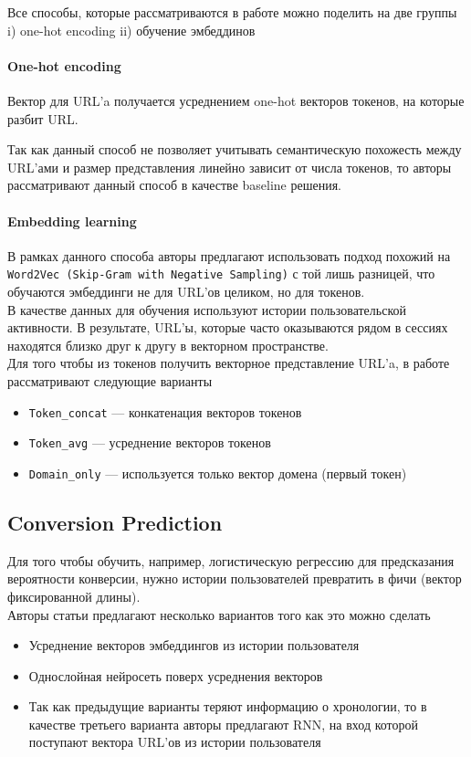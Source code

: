 Все способы, которые рассматриваются в работе можно поделить на две группы i) one-hot encoding ii) обучение эмбеддинов

\paragraph{One-hot encoding} Вектор для URL'a получается усреднением one-hot векторов токенов, на которые разбит URL.

Так как данный способ не позволяет учитывать семантическую похожесть между URL'ами и размер представления линейно зависит от числа токенов, то авторы рассматривают данный способ в качестве baseline решения.

\paragraph{Embedding learning} В рамках данного способа авторы предлагают использовать подход похожий на \texttt{Word2Vec (Skip-Gram with Negative Sampling)} с той лишь разницей, что обучаются эмбеддинги не для URL'ов целиком, но для токенов. \\

В качестве данных для обучения используют истории пользовательской активности. В результате, URL'ы, которые часто оказываются рядом в сессиях находятся близко друг к другу в векторном пространстве. \\

Для того чтобы из токенов получить векторное представление URL'a, в работе рассматривают следующие варианты
\begin{itemize}
    \item \texttt{Token\_concat} --- конкатенация векторов токенов
    \item \texttt{Token\_avg} --- усреднение векторов токенов
    \item \texttt{Domain\_only} --- используется только вектор домена (первый токен)
\end{itemize}

\subsection{Conversion Prediction}

Для того чтобы обучить, например, логистическую регрессию для предсказания вероятности конверсии, нужно истории пользователей превратить в фичи (вектор фиксированной длины). \\

Авторы статьи предлагают несколько вариантов того как это можно сделать
\begin{itemize}
    \item Усреднение векторов эмбеддингов из истории пользователя
    \item Однослойная нейросеть поверх усреднения векторов
    \item Так как предыдущие варианты теряют информацию о хронологии, то в качестве третьего варианта авторы предлагают RNN, на вход которой поступают вектора URL'ов из истории пользователя
\end{itemize}

